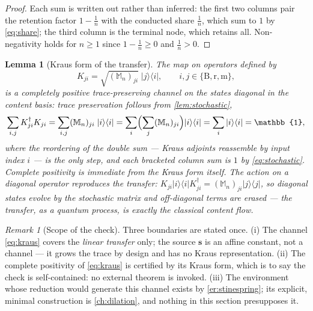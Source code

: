 \documentclass[11pt]{amsbook}
\theoremstyle{plain}
\newtheorem{lemma}[theorem]{Lemma}
\theoremstyle{definition}
\theoremstyle{remark}
\newtheorem{remark}[theorem]{Remark}
\newcommand{\uses}[1]{\par\nopagebreak\noindent{\footnotesize\emph{Uses: #1.}\par}}
\begin{document}
\begin{proof}
Each sum is written out rather than inferred: the first two columns pair the retention factor $1 - \tfrac1n$ with the conducted share $\tfrac1n$, which sum to $1$ by \cref{eq:share}; the third column is the terminal node, which retains all. Non-negativity holds for $n \geq 1$ since $1 - \tfrac1n \geq 0$ and $\tfrac1n > 0$.
\end{proof}

\begin{lemma}[Kraus form of the transfer]\label{lem:kraus}
The map on operators defined by
\begin{equation}\label{eq:kraus}
K_{ji} = \sqrt{(\mathbb{M}_{n})_{ji}}\; |j\rangle\langle i|, \qquad i, j \in \{\mathrm B, \mathrm r, \mathrm m\},
\end{equation}
is a completely positive trace-preserving channel on the states diagonal in the content basis: trace preservation follows from \cref{lem:stochastic},
\begin{equation}\label{eq:complete}
\sum_{i,j} K_{ji}^{\dagger} K_{ji}
= \sum_{i,j} (\mathbb{M}_{n})_{ji}\; |i\rangle\langle i|
= \sum_{i} \Bigl( \sum_{j} (\mathbb{M}_{n})_{ji} \Bigr) |i\rangle\langle i|
= \sum_{i} |i\rangle\langle i| = \mathbb{1},
\end{equation}
where the reordering of the double sum --- Kraus adjoints reassemble by input index $i$ --- is the only step, and each bracketed column sum is $1$ by \cref{eq:stochastic}. Complete positivity is immediate from the Kraus form itself. The action on a diagonal operator reproduces the transfer: $K_{ji} |i\rangle\langle i| K_{ji}^{\dagger} = (\mathbb{M}_{n})_{ji} |j\rangle\langle j|$, so diagonal states evolve by the stochastic matrix and off-diagonal terms are erased --- the transfer, as a quantum process, is exactly the classical content flow.
\uses{\cref{lem:stochastic}}
\end{lemma}

\begin{remark}[Scope of the check]\label{rem:cptp-scope}
Three boundaries are stated once. (i) The channel \cref{eq:kraus} covers the \emph{linear transfer} only; the source $\boldsymbol{s}$ is an affine constant, not a channel --- it grows the trace by design and has no Kraus representation. (ii) The complete positivity of \cref{eq:kraus} is certified by its Kraus form, which is to say the check is self-contained: no external theorem is invoked. (iii) The environment whose reduction would generate this channel exists by \cref{er:stinespring}; its explicit, minimal construction is \cref{ch:dilation}, and nothing in this section presupposes it.
\end{remark}
\end{document}
